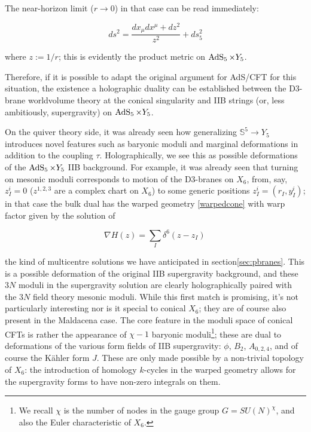 The near-horizon limit ($r\rightarrow 0$) in that case can be read immediately:

\begin{equation}
ds^2 = \frac{ dx_\mu dx^\mu + dz^2}{z^2} + ds_5^2
\end{equation}

where $z := 1/r$; this is evidently the product metric on $\operatorname{AdS}_{5} \times Y_5$.

Therefore, if it is possible to adapt the original argument for AdS/CFT for this situation, the existence a holographic duality can be established between the D3-brane worldvolume theory at the conical singularity and IIB strings (or, less ambitiously, supergravity) on $\operatorname{AdS}_{5} \times Y_5$.

On the quiver theory side, it was already seen how generalizing $\mathbb{S}^5 \rightarrow Y_5$ introduces novel features such as baryonic moduli and marginal deformations in addition to the coupling $\tau$. Holographically, we see this as possible deformations of the $\operatorname{AdS}_{5} \times Y_5$ IIB background. For example, it was already seen that turning on mesonic moduli corresponds to motion of the D3-branes on $X_6$, from, say, $z_I^i = 0$ ($z^{1,2,3}$ are a complex chart on $X_6$) to some generic positions $z_I^i = (r_I, y_I^i)$; in that case the bulk dual has the warped geometry \eqref{warpedcone} with warp factor given by the solution of\cite{MZ}

\begin{equation}
	\nabla H (z) = \sum_I \delta^6(z - z_I)\,
	\label{}
\end{equation}

the kind of multicentre solutions we have anticipated in section\ref{sec:pbranes}. This is a possible deformation of the original IIB supergravity background, and these $3N$ moduli in the supergravity solution are clearly holographically paired with the $3N$ field theory mesonic moduli. While this first match is promising, it's not particularly interesting nor is it special to conical $X_6$; they are of course also present in the Maldacena case. The core feature in the moduli space of conical CFTs is rather the appearance of $\chi-1$ baryonic moduli\footnote{We recall $\chi$ is the number of nodes in the gauge group $G = SU(N)^\chi$, and also the Euler characteristic of $X_6$.}; these are dual to deformations of the various form fields of IIB supergravity: $\phi$, $B_2$, $A_{0,2,4}$, and of course the K\"ahler form $J$. These are only made possible by a non-trivial topology of $X_6$: the introduction of homology $k$-cycles in the warped geometry allows for the supergravity forms to have non-zero integrals on them.

